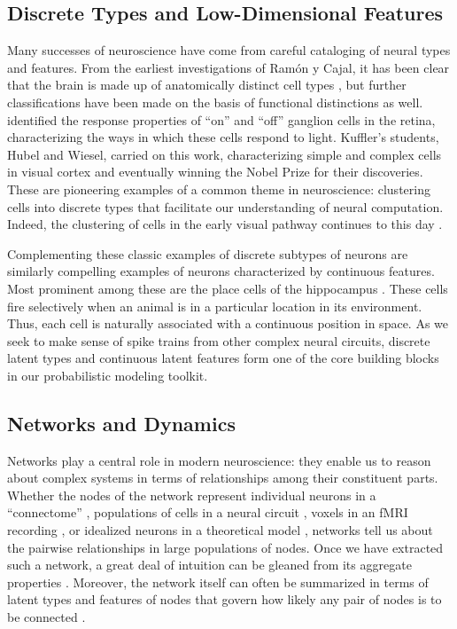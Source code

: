 \subsection{Discrete Types and Low-Dimensional Features}
Many successes of neuroscience have come from careful cataloging of
neural types and features.  From the earliest investigations of
Ram\'on y Cajal, it has been clear that the brain is made up of
anatomically distinct cell types \citep{cajal1899textura}, but further
classifications have been made on the basis of functional distinctions
as well. \citet{kuffler1953discharge} identified the response
properties of ``on'' and ``off'' ganglion cells in the retina,
characterizing the ways in which these cells respond to light. 
Kuffler's students, Hubel and Wiesel, carried on this work,
characterizing simple and complex cells in visual cortex
\citep{hubel1962receptive} and eventually winning the Nobel Prize for
their discoveries.  These are pioneering examples of a common theme in
neuroscience: clustering cells into discrete types that facilitate our
understanding of neural computation. Indeed, the clustering of cells
in the early visual pathway continues to this day
\citep{macosko2015highly, sanes2015types}.

Complementing these classic examples of discrete subtypes of neurons 
are similarly compelling examples of neurons characterized by 
continuous features. Most prominent among these are the place cells 
of the hippocampus \citep{OKeefe78}. These cells fire selectively 
when an animal is in a particular location in its environment. Thus,
each cell is naturally associated with a continuous position in 
space. As we seek to make sense of spike trains from other complex neural circuits, 
discrete latent types and continuous latent features form one of the
core building blocks in our probabilistic modeling toolkit. 


\subsection{Networks and Dynamics}
Networks play a central role in modern neuroscience: they enable us to
reason about complex systems in terms of relationships among their
constituent parts. Whether the nodes of the network represent
individual neurons in a ``connectome''
\citep[e.g.][]{sporns2005human}, populations of cells in a neural
circuit \citep[e.g.][]{felleman1991distributed}, voxels in an fMRI
recording \citep[e.g.][]{friston1994functional}, or idealized neurons
in a theoretical model \citep[e.g.][]{hopfield1982neural}, networks
tell us about the pairwise relationships in large populations of
nodes.  Once we have extracted such a network, a great deal of
intuition can be gleaned from its aggregate properties
\citep{bullmore2009complex, newman2003structure}.  Moreover, the
network itself can often be summarized in terms of latent types and
features of nodes that govern how likely any pair of nodes is to be
connected \citep{Goldenberg-2010}.

